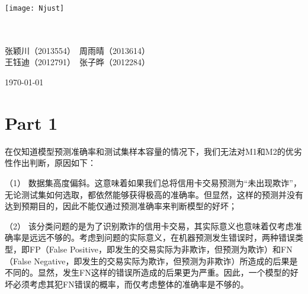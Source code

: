 \documentclass[a4paper,12pt]{article}
\begin{document}
	\begin{titlepage}
		\begin{center}
			
			\texttt{[image: Njust]}\\
			\vspace{10mm}
			\vspace{40mm}
			\textbf{}\\%
		\end{center}
		
		\vspace{\fill}
		
		\setlength{\extrarowheight}{3mm}
		{\songti{}	
			
			
			\begin{center}
				\\
				张颖川（2013554）\ 周雨晴（2013614）\\ 王钰迪（2012791）\ 张子晔（2012284）
			\end{center}
			
			\begin{center}
				\vspace{\fill}
				\today
			\end{center}	
		}
	\end{titlepage}
\newpage
	\tableofcontents
	\newpage
	\section{Part 1}
	在仅知道模型预测准确率和测试集样本容量的情况下，我们无法对M1和M2的优劣性作出判断，原因如下：
	
	（1）	数据集高度偏斜。这意味着如果我们总将信用卡交易预测为“未出现欺诈”，无论测试集如何选取，都依然能够获得极高的准确率。但显然，这样的预测并没有达到预期目的，因此不能仅通过预测准确率来判断模型的好坏；
	
	（2）	该分类问题的是为了识别欺诈的信用卡交易，其实际意义也意味着仅考虑准确率是远远不够的。考虑到问题的实际意义，在机器预测发生错误时，两种错误类型，即FP（False Positive，即发生的交易实际为非欺诈，但预测为欺诈）和FN（False Negative，即发生的交易实际为欺诈，但预测为非欺诈）所造成的后果是不同的。显然，发生FN这样的错误所造成的后果更为严重。因此，一个模型的好坏必须考虑其犯FN错误的概率，而仅考虑整体的准确率是不够的。
	
\end{document}
